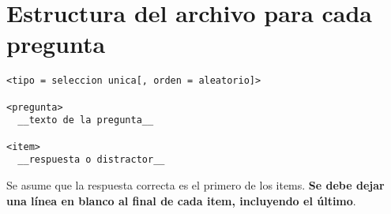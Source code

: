 \documentclass[12pt]{article}
\theoremstyle{definition}
\begin{document}
\section{Estructura del archivo para cada pregunta}

\begin{verbatim}
<tipo = seleccion unica[, orden = aleatorio]>

<pregunta>
  __texto de la pregunta__

<item>
  __respuesta o distractor__

\end{verbatim}

Se asume que la respuesta correcta es el primero de los items. \textbf{Se debe dejar una l\'inea en blanco al final de cada item, incluyendo el \'ultimo}.
\end{document}
